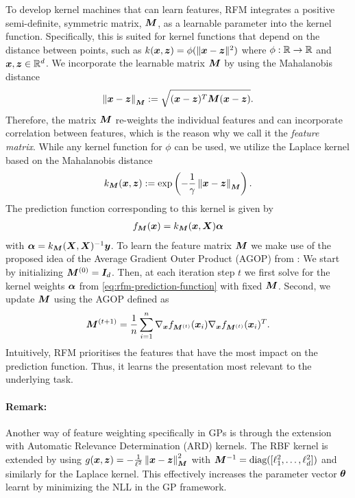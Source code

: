 To develop kernel machines that can learn features, RFM integrates a positive semi-definite, symmetric matrix, ${\bm{M}}$, as a learnable parameter into the kernel function. Specifically, this is suited for kernel functions that depend on the distance between points, such as $k({\bm{x}}, {\bm{z}}) = \phi(\|{\bm{x}} - {\bm{z}}\|^2)$ where $ \phi: \mathbb{R} \to \mathbb{R}$ and $ {\bm{x}}, {\bm{z}} \in \mathbb{R}^d$. We incorporate the learnable matrix ${\bm{M}}$ by using the Mahalanobis distance
\begin{align}
    \left\|{\bm{x}}-{\bm{z}}\right\|_{\bm{M}} := \sqrt{({\bm{x}}-{\bm{z}})^T{\bm{M}}({\bm{x}}-{\bm{z}})}.
\end{align}
Therefore, the matrix ${\bm{M}}$ re-weights the individual features and can incorporate correlation between features, which is the reason why we call it the \emph{feature matrix}.
While any kernel function for $\phi$ can be used, we utilize the Laplace kernel based on the Mahalanobis distance
\begin{align}
    k_{\bm{M}}({\bm{x}},{\bm{z}}) := \exp\left(-\frac{1}{\gamma}\left\|{\bm{x}}-{\bm{z}}\right\|_{\bm{M}}\right).
\end{align}
The prediction function corresponding to this kernel is given by
\begin{align}
    f_{\bm{M}}({\bm{x}}) = k_{\bm{M}}({\bm{x}},{\bm{X}})\bm{\alpha}
    \label{eq:rfm-prediction-function}
\end{align}
with $\bm{\alpha} = k_{\bm{M}}({\bm{X}},{\bm{X}})^{-1}{\bm{y}}$. To learn the feature matrix ${\bm{M}}$ we make use of the proposed idea of the Average Gradient Outer Product (AGOP) from \citet{radhakrishnan2022feature}: We start by initializing ${\bm{M}}^{(0)}={\bm{I}}_d$. Then, at each iteration step $t$ we first solve for the kernel weights $\bm{\alpha}$ from \cref{eq:rfm-prediction-function} with fixed ${\bm{M}}$. Second, we update ${\bm{M}}$ using the AGOP defined as
\begin{align}
    {\bm{M}}^{(t+1)} = \frac{1}{n}\sum_{i=1}^n \nabla_{{\bm{x}}}f_{{\bm{M}}^{(t)}}({\bm{x}}_i)\nabla_{{\bm{x}}}f_{{\bm{M}}^{(t)}}({\bm{x}}_i)^T.
    \label{eq:agop}
\end{align}
Intuitively, RFM prioritises the features that have the most impact on the prediction function. Thus, it learns the presentation most relevant to the underlying task.


\paragraph{Remark:} Another way of feature weighting specifically in GPs is through the extension with Automatic Relevance Determination (ARD) \cite{neal1996bayesian} kernels. The RBF kernel is extended by using $g({\bm{x}},{\bm{z}})=-\frac{1}{\ell^2}\left\|{\bm{x}}-{\bm{z}}\right\|^2_{\bm{M}}$ with ${\bm{M}}^{-1}=\text{diag}([\ell_1^2,\dots,\ell_d^2])$ and similarly for the Laplace kernel. This effectively increases the parameter vector ${\bm{\theta}}$ learnt by minimizing the NLL in the GP framework.









